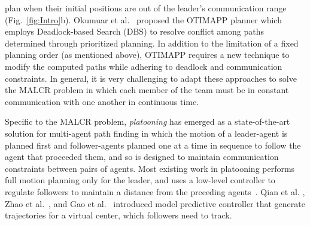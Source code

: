 \documentclass[letterpaper, 10 pt, conference]{ieeeconf}  %
\begin{document}
plan when their initial positions are out of the leader's communication range (Fig.~\ref{fig:Intro}b).
Okumuar et al.~\cite{okumura2023offline} proposed the OTIMAPP planner which employs Deadlock-based 
Search (DBS) to resolve conflict among paths determined through prioritized planning. 
In addition to the limitation of a fixed planning order (as mentioned above), OTIMAPP requires 
a new technique to modify the computed paths while adhering to deadlock and communication constraints.
In general, it is very challenging to adapt these approaches to solve the MALCR problem
in which each member of the team must be in constant communication with one another in continuous time. 

Specific to the MALCR problem, \emph{platooning} has emerged as a state-of-the-art solution for multi-agent 
path finding in which the motion of a leader-agent is planned first and follower-agents planned one at a time 
in sequence to follow the agent that proceeded them, and so is designed to maintain communication constraints between pairs of agents.
Most existing work in platooning performs full motion planning only for the leader, and uses a low-level 
controller to regulate followers to maintain a distance from the preceding agents~\cite{shojaei2019tracking,huang2019platoon}.
Qian et al. \cite{qian2016mpcautonomousvehicles}, Zhao et al.~\cite{zhao2017design}, and Gao et al.~\cite{gao2019multilane} 
introduced model predictive controller that generate trajectories for a virtual center, which followers need to track.
\end{document}
